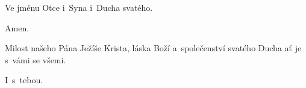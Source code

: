 \mbox{}

Ve jménu Otce i~Syna \grealtcross{} i~Ducha svatého.

\Rbardot{} Amen.
	   	
\Vbardot{} Milost našeho Pána Ježíše Krista, láska Boží a~společenství svatého Ducha ať
je s~vámi se všemi.

\Rbardot{} I~s~tebou.
